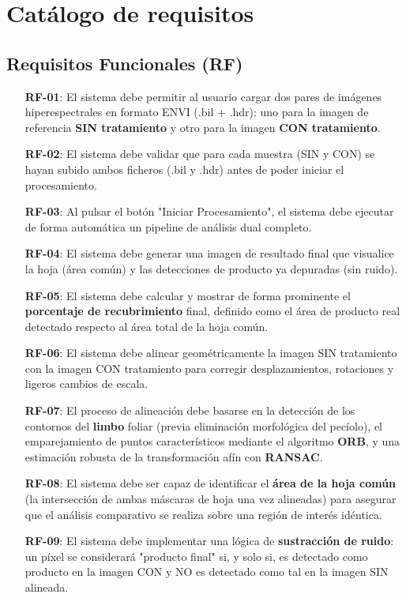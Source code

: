 \section{Catálogo de requisitos}

\subsection{Requisitos Funcionales (RF)}
\begin{itemize}
    \item[\textbf{RF-01}:] El sistema debe permitir al usuario cargar dos pares de imágenes hiperespectrales en formato ENVI (.bil + .hdr): uno para la imagen de referencia \textbf{SIN tratamiento} y otro para la imagen \textbf{CON tratamiento}.
    \item[\textbf{RF-02}:] El sistema debe validar que para cada muestra (SIN y CON) se hayan subido ambos ficheros (.bil y .hdr) antes de poder iniciar el procesamiento.
    \item[\textbf{RF-03}:] Al pulsar el botón "Iniciar Procesamiento", el sistema debe ejecutar de forma automática un pipeline de análisis dual completo.
    \item[\textbf{RF-04}:] El sistema debe generar una imagen de resultado final que visualice la hoja (área común) y las detecciones de producto ya depuradas (sin ruido).
    \item[\textbf{RF-05}:] El sistema debe calcular y mostrar de forma prominente el \textbf{porcentaje de recubrimiento} final, definido como el área de producto real detectado respecto al área total de la hoja común.
    \item[\textbf{RF-06}:] El sistema debe alinear geométricamente la imagen SIN tratamiento con la imagen CON tratamiento para corregir desplazamientos, rotaciones y ligeros cambios de escala.
    \item[\textbf{RF-07}:] El proceso de alineación debe basarse en la detección de los contornos del \textbf{limbo} foliar (previa eliminación morfológica del pecíolo), el emparejamiento de puntos característicos mediante el algoritmo \textbf{ORB}, y una estimación robusta de la transformación afín con \textbf{RANSAC}.
    \item[\textbf{RF-08}:] El sistema debe ser capaz de identificar el \textbf{área de la hoja común} (la intersección de ambas máscaras de hoja una vez alineadas) para asegurar que el análisis comparativo se realiza sobre una región de interés idéntica.
    \item[\textbf{RF-09}:] El sistema debe implementar una lógica de \textbf{sustracción de ruido}: un píxel se considerará "producto final" si, y solo si, es detectado como producto en la imagen CON y NO es detectado como tal en la imagen SIN alineada.

\end{itemize}
